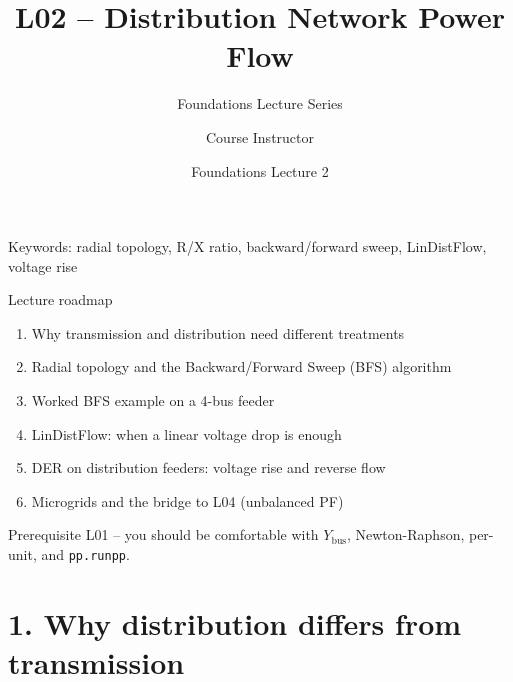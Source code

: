\documentclass[aspectratio=169,10pt]{beamer}
\title[L02: Distribution PF]{L02 -- Distribution Network Power Flow}
\subtitle{Foundations Lecture Series}
\author{Course Instructor}
\institute{Microgrid 3-phase Security AI Project}
\date{Foundations Lecture 2}
\newcommand{\code}[1]{\texttt{#1}}
\begin{document}
\begin{frame}
  \titlepage
  \vspace{-0.8em}
  \begin{center}
    \small Keywords: radial topology, R/X ratio, backward/forward sweep, LinDistFlow, voltage rise
  \end{center}
\end{frame}

\begin{frame}{Lecture roadmap}
\begin{enumerate}
  \item Why transmission and distribution need different treatments
  \item Radial topology and the Backward/Forward Sweep (BFS) algorithm
  \item Worked BFS example on a 4-bus feeder
  \item LinDistFlow: when a linear voltage drop is enough
  \item DER on distribution feeders: voltage rise and reverse flow
  \item Microgrids and the bridge to L04 (unbalanced PF)
\end{enumerate}
\vspace{0.6em}
\begin{block}{Prerequisite}
L01 -- you should be comfortable with $Y_{\text{bus}}$, Newton-Raphson, per-unit, and \code{pp.runpp}.
\end{block}
\end{frame}

\section*{1. Why distribution differs from transmission}
\end{document}
